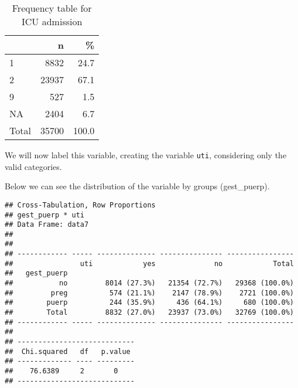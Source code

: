 \documentclass[
]{article}
\newenvironment{Shaded}{\begin{snugshade}}{\end{snugshade}}
\newcommand{\DataTypeTok}[1]{\textcolor[rgb]{0.13,0.29,0.53}{#1}}
\newcommand{\KeywordTok}[1]{\textcolor[rgb]{0.13,0.29,0.53}{\textbf{#1}}}
\newcommand{\NormalTok}[1]{#1}
\newcommand{\OperatorTok}[1]{\textcolor[rgb]{0.81,0.36,0.00}{\textbf{#1}}}
\newcommand{\OtherTok}[1]{\textcolor[rgb]{0.56,0.35,0.01}{#1}}
\newcommand{\StringTok}[1]{\textcolor[rgb]{0.31,0.60,0.02}{#1}}
\begin{document}
\begin{table}[!h]

\caption{\label{tab:unnamed-chunk-177}Frequency table for ICU admission}
\centering
\begin{tabular}[t]{l|r|r}
\hline
  & n & \%\\
\hline
1 & 8832 & 24.7\\
\hline
2 & 23937 & 67.1\\
\hline
9 & 527 & 1.5\\
\hline
NA & 2404 & 6.7\\
\hline
Total & 35700 & 100.0\\
\hline
\end{tabular}
\end{table}

We will now label this variable, creating the variable \texttt{uti},
considering only the valid categories.

\begin{Shaded}
\end{Shaded}

Below we can see the distribution of the variable by groups
(gest\_puerp).

\begin{Shaded}
\end{Shaded}

\begin{verbatim}
## Cross-Tabulation, Row Proportions  
## gest_puerp * uti  
## Data Frame: data7  
## 
## 
## ------------ ----- -------------- --------------- ----------------
##                uti            yes              no            Total
##   gest_puerp                                                      
##           no         8014 (27.3%)   21354 (72.7%)   29368 (100.0%)
##         preg          574 (21.1%)    2147 (78.9%)    2721 (100.0%)
##        puerp          244 (35.9%)     436 (64.1%)     680 (100.0%)
##        Total         8832 (27.0%)   23937 (73.0%)   32769 (100.0%)
## ------------ ----- -------------- --------------- ----------------
## 
## ----------------------------
##  Chi.squared   df   p.value 
## ------------- ---- ---------
##    76.6389     2       0    
## ----------------------------
\end{verbatim}
\end{document}
